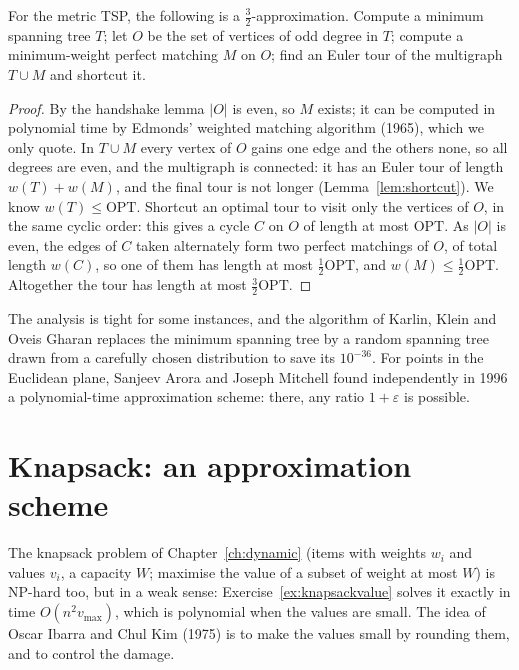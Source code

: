 \begin{theorem}\label{thm:christofides}
For the metric TSP, the following is a $\frac32$-approximation. Compute a minimum spanning tree $T$; let $O$ be the set of vertices of odd degree in $T$; compute a minimum-weight perfect matching $M$ on $O$; find an Euler tour of the multigraph $T\cup M$ and shortcut it.
\end{theorem}
\begin{proof}
By the handshake lemma $|O|$ is even, so $M$ exists; it can be computed in polynomial time by Edmonds' weighted matching algorithm (1965), which we only quote. In $T\cup M$ every vertex of $O$ gains one edge and the others none, so all degrees are even, and the multigraph is connected: it has an Euler tour of length $w(T)+w(M)$, and the final tour is not longer (Lemma~\ref{lem:shortcut}).
We know $w(T)\le\mathrm{OPT}$. Shortcut an optimal tour to visit only the vertices of $O$, in the same cyclic order: this gives a cycle $C$ on $O$ of length at most $\mathrm{OPT}$. As $|O|$ is even, the edges of $C$ taken alternately form two perfect matchings of $O$, of total length $w(C)$, so one of them has length at most $\frac12\mathrm{OPT}$, and $w(M)\le\frac12\mathrm{OPT}$. Altogether the tour has length at most $\frac32\mathrm{OPT}$.
\end{proof}

The analysis is tight for some instances, and the algorithm of Karlin, Klein and Oveis Gharan replaces the minimum spanning tree by a random spanning tree drawn from a carefully chosen distribution to save its $10^{-36}$. For points in the Euclidean plane, Sanjeev Arora and Joseph Mitchell found independently in 1996 a polynomial-time approximation scheme: there, any ratio $1+\varepsilon$ is possible.

\section{Knapsack: an approximation scheme}\label{sec:fptas}

The knapsack problem of Chapter~\ref{ch:dynamic} (items with weights $w_i$ and values $v_i$, a capacity $W$; maximise the value of a subset of weight at most $W$) is NP-hard too, but in a weak sense: Exercise~\ref{ex:knapsackvalue} solves it exactly in time $O(n^2v_{\max})$, which is polynomial when the values are small. The idea of Oscar Ibarra and Chul Kim (1975) is to make the values small by rounding them, and to control the damage.

